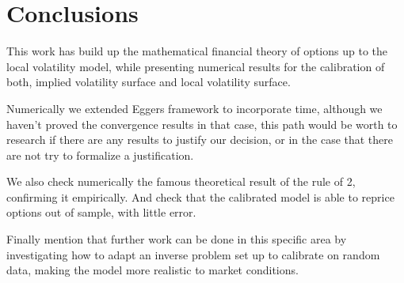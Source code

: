 \chapter{Conclusions}

This work has build up the mathematical financial theory of options up to the local volatility model,
while presenting numerical results for the calibration of both,
implied volatility surface and local volatility surface.

Numerically we extended Eggers \cite{egger2005tikhonov} framework to incorporate time,
although we haven't proved the convergence results in that case,
this path would be worth to research if there are any results to justify our decision,
or in the case that there are not try to formalize a justification.

We also check numerically the famous theoretical result of the rule of 2,
confirming it empirically.
And check that the calibrated model is able to reprice options out of sample,
with little error.

Finally mention that further work can be done in this specific area
by investigating how to adapt an inverse problem set up to calibrate on random data,
making the model more realistic to market conditions.
